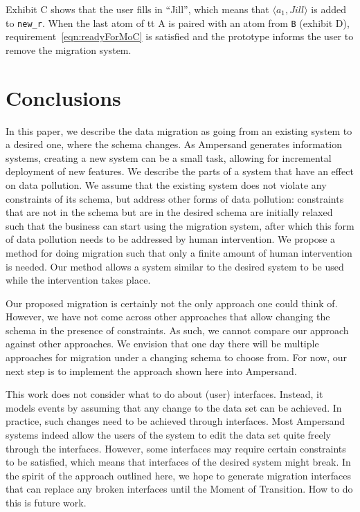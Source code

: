 \documentclass[runningheads]{llncs}
\newcommand{\pair}[2]{\langle{#1},{#2}\rangle}
\begin{document}
   Exhibit C shows that the user fills in ``Jill'', which means that $\pair{a_1}{Jill}$ is added to {\small\verb#new_r#}.
   When the last atom of {tt A} is paired with an atom from {\tt B} (exhibit D), requirement~\ref{eqn:readyForMoC} is satisfied and the prototype informs the user to remove the migration system.

\section{Conclusions}
\label{sct:Conclusions}
   In this paper, we describe the data migration as going from an existing system to a desired one, where the schema changes.
   As Ampersand generates information systems, creating a new system can be a small task, allowing for incremental deployment of new features.
   We describe the parts of a system that have an effect on data pollution.
   We assume that the existing system does not violate any constraints of its schema, but address other forms of data pollution:
   constraints that are not in the schema but are in the desired schema are initially relaxed such that the business can start using the migration system, after which this form of data pollution needs to be addressed by human intervention.
   We propose a method for doing migration such that only a finite amount of human intervention is needed.
   Our method allows a system similar to the desired system to be used while the intervention takes place.

   Our proposed migration is certainly not the only approach one could think of.
   However, we have not come across other approaches that allow changing the schema in the presence of constraints.
   As such, we cannot compare our approach against other approaches.
   We envision that one day there will be multiple approaches for migration under a changing schema to choose from.
   For now, our next step is to implement the approach shown here into Ampersand.

   This work does not consider what to do about (user) interfaces.
   Instead, it models events by assuming that any change to the data set can be achieved.
   In practice, such changes need to be achieved through interfaces.
   Most Ampersand systems indeed allow the users of the system to edit the data set quite freely through the interfaces.
   However, some interfaces may require certain constraints to be satisfied, which means that interfaces of the desired system might break.
   In the spirit of the approach outlined here, we hope to generate migration interfaces that can replace any broken interfaces until the Moment of Transition.
   How to do this is future work.



\end{document}
